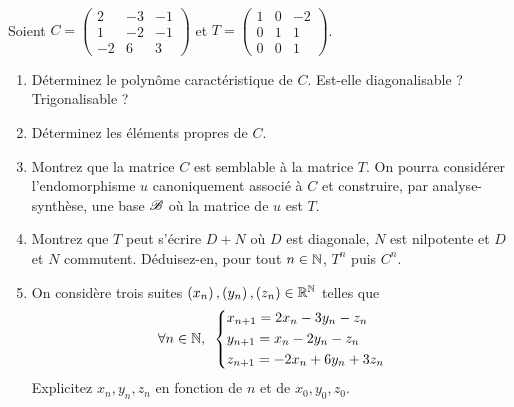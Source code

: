 \begin{exos}[Exercice 20]~\\
Soient \(C=\begin{pmatrix}
2 & -3 & -1 \\
1 & -2 & -1 \\
-2 & 6 & 3
\end{pmatrix}\) et \(T=\begin{pmatrix}
1 & 0 & -2 \\
0 & 1 & 1 \\
0 & 0 & 1
\end{pmatrix}\).

\begin{enumerate}
    \item Déterminez le polynôme caractéristique de \(C\). Est-elle diagonalisable ? Trigonalisable ? \\
    \item Déterminez les éléments propres de \(C\). \\
    \item Montrez que la matrice \(C\) est semblable à la matrice \(T\). On pourra considérer l'endomorphisme \(u\) canoniquement associé à \(C\) et construire, par analyse-synthèse, une base \(\mathscr{B}\) où la matrice de \(u\) est \(T\). \\
    \item Montrez que \(T\) peut s'écrire \(D+N\) où \(D\) est diagonale, \(N\) est nilpotente et \(D\) et \(N\) commutent. Déduisez-en, pour tout \(n\in\mathbb{N}\), \(T^n\) puis \(C^n\). \\
    \item On considère trois suites \(\left(x_n\right),\left(y_n\right),\left(z_n\right)\in\mathbb{R}^{\mathbb{N}}\) telles que \[\quantifs{\forall n\in\N}\begin{dcases}
        x_{n+1}=2x_n-3y_n-z_n \\
        y_{n+1}=x_n-2y_n-z_n \\
        z_{n+1}=-2x_n+6y_n+3z_n
    \end{dcases}\] Explicitez \(x_n,y_n,z_n\) en fonction de \(n\) et de \(x_0,y_0,z_0\).
\end{enumerate}
\end{exos}

\begin{corr}
\end{corr}

